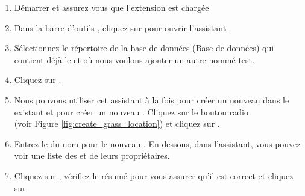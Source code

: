 \begin{enumerate}
  \item Démarrer \qg et assurez vous que l'extension \grass est chargée
  \item Dans la barre d'outils \grass, cliquez sur  pour ouvrir l'assistant .
  \item Sélectionnez le répertoire  de la base de données \grass (Base de données) qui contient déjà le  et où nous voulons ajouter un autre  nommé test.
  \item Cliquez sur .
  \item Nous pouvons utiliser cet assistant à la fois pour créer un nouveau  dans le  existant et pour créer un nouveau . Cliquez sur le bouton radio\\  (voir Figure \ref{fig:create_grass_location}) et cliquez sur .
  \item Entrez le  du nom pour le nouveau . En dessous, dans l'assistant, vous pouvez voir une liste des  et de leurs propriétaires.
  \item Cliquez sur , vérifiez le résumé pour vous assurer qu'il est correct et cliquez sur 
\end{enumerate}

